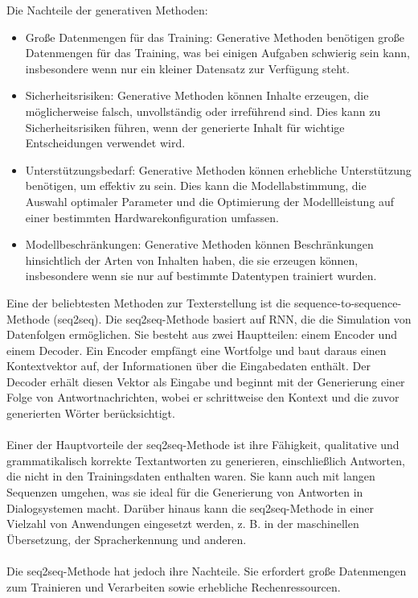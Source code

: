Die Nachteile der generativen Methoden:
\begin{itemize}
    \item Große Datenmengen für das Training: Generative Methoden benötigen große Datenmengen für das Training, was bei einigen Aufgaben schwierig sein kann, insbesondere wenn nur ein kleiner Datensatz zur Verfügung steht.
    \item Sicherheitsrisiken: Generative Methoden können Inhalte erzeugen, die möglicherweise falsch, unvollständig oder irreführend sind. Dies kann zu Sicherheitsrisiken führen, wenn der generierte Inhalt für wichtige Entscheidungen verwendet wird.
    \item Unterstützungsbedarf: Generative Methoden können erhebliche Unterstützung benötigen, um effektiv zu sein. Dies kann die Modellabstimmung, die Auswahl optimaler Parameter und die Optimierung der Modellleistung auf einer bestimmten Hardwarekonfiguration umfassen.
    \item Modellbeschränkungen: Generative Methoden können Beschränkungen hinsichtlich der Arten von Inhalten haben, die sie erzeugen können, insbesondere wenn sie nur auf bestimmte Datentypen trainiert wurden.
\end{itemize}
Eine der beliebtesten Methoden zur Texterstellung ist die sequence-to-sequence-Methode (seq2seq). 
Die seq2seq-Methode basiert auf \ac{RNN}, die die Simulation von Datenfolgen ermöglichen. 
Sie besteht aus zwei Hauptteilen: einem Encoder und einem Decoder. 
Ein Encoder empfängt eine Wortfolge und baut daraus einen Kontextvektor auf, der Informationen über die Eingabedaten enthält. 
Der Decoder erhält diesen Vektor als Eingabe und beginnt mit der Generierung einer Folge von Antwortnachrichten, wobei er schrittweise den Kontext und die zuvor generierten Wörter berücksichtigt. \cite{seq2seq_alammar}\\\\
Einer der Hauptvorteile der seq2seq-Methode ist ihre Fähigkeit, qualitative und grammatikalisch korrekte Textantworten zu generieren, einschließlich Antworten, die nicht in den Trainingsdaten enthalten waren. 
Sie kann auch mit langen Sequenzen umgehen, was sie ideal für die Generierung von Antworten in Dialogsystemen macht. 
Darüber hinaus kann die seq2seq-Methode in einer Vielzahl von Anwendungen eingesetzt werden, z. B. in der maschinellen Übersetzung, der Spracherkennung und anderen.\\\\
Die seq2seq-Methode hat jedoch ihre Nachteile. 
Sie erfordert große Datenmengen zum Trainieren und Verarbeiten sowie erhebliche Rechenressourcen. 
